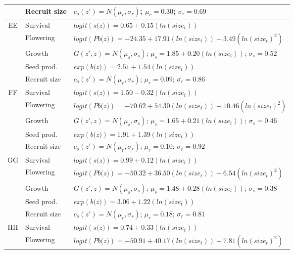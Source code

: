 \documentclass[12pt, letterpaper]{article}
\begin{document}
\begin{spacing}{1.3}
\begin{longtable}[ht!]{c|l|p{}}
         & Recruit size  &  $c_o(z') = N(\mu_r, \sigma_r)$; $\mu_r = 0.30$; $\sigma_r = 0.69$ \\
         \hline
         \rowcolor[gray]{.95}EE  &  Survival  &  $logit(\textit{s(z)})= 0.65+0.15(ln(size_t))$ \\
         & Flowering  & $logit(\textit{Pb(z)})  = -24.35 + 17.91(ln(size_t)) -3.49(ln(size_t)^2)$ \\
         \rowcolor[gray]{.95}& Growth  &  $G(z',z) = N(\mu_s, \sigma_s)$; $\mu_s = 1.85 + 0.20(ln(size_t))$; $\sigma_s = 0.52$\\
         & Seed prod.  & $exp(\textit{b(z)}) = 2.51 + 1.54(ln(size_t))$  \\
         \rowcolor[gray]{.95}& Recruit size  &  $c_o(z') = N(\mu_r, \sigma_r)$; $\mu_r = 0.09$; $\sigma_r = 0.86$ \\
         \hline
         FF  &  Survival  &  $logit(\textit{s(z)})= 1.50-0.32(ln(size_t))$ \\
         \rowcolor[gray]{.95}& Flowering  & $logit(\textit{Pb(z)})  = -70.62 + 54.30(ln(size_t)) -10.46(ln(size_t)^2)$ \\
         & Growth  &  $G(z',z) = N(\mu_s, \sigma_s)$; $\mu_s = 1.65 + 0.21(ln(size_t))$; $\sigma_s = 0.46$\\
         \rowcolor[gray]{.95}& Seed prod.  & $exp(\textit{b(z)}) = 1.91 + 1.39(ln(size_t))$  \\
         & Recruit size  &  $c_o(z') = N(\mu_r, \sigma_r)$; $\mu_r = 0.10$; $\sigma_r = 0.92$ \\
        \hline
         \rowcolor[gray]{.95}GG  &  Survival  &  $logit(\textit{s(z)})= 0.99+0.12(ln(size_t))$ \\
         & Flowering  & $logit(\textit{Pb(z)})  = -50.32 + 36.50(ln(size_t)) -6.54(ln(size_t)^2)$ \\
         \rowcolor[gray]{.95}& Growth  &  $G(z',z) = N(\mu_s, \sigma_s)$; $\mu_s = 1.48 + 0.28(ln(size_t))$; $\sigma_s = 0.38$\\
         & Seed prod.  & $exp(\textit{b(z)}) = 3.06 + 1.22(ln(size_t))$  \\
         \rowcolor[gray]{.95}& Recruit size  &  $c_o(z') = N(\mu_r, \sigma_r)$; $\mu_r = 0.18$; $\sigma_r = 0.81$ \\ \hline
         HH  &  Survival  &  $logit(\textit{s(z)})= 0.74+0.33(ln(size_t))$ \\
         \rowcolor[gray]{.95}& Flowering  & $logit(\textit{Pb(z)})  = -50.91 + 40.17(ln(size_t)) -7.81(ln(size_t)^2)$ \\

\end{longtable}
\end{spacing}
\end{document}

